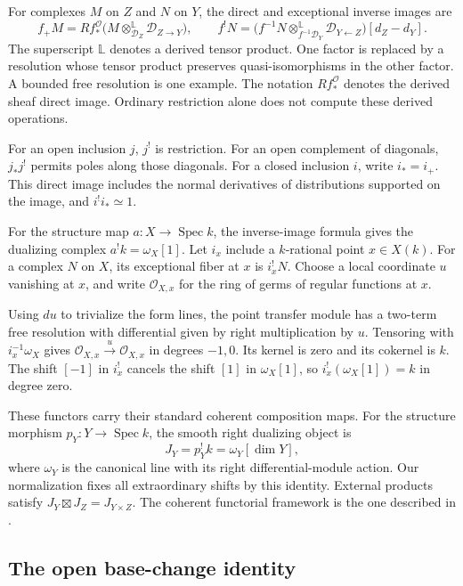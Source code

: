 For complexes $M$ on $Z$ and $N$ on $Y$, the direct and
exceptional inverse images are
\[
 f_+M=Rf_*^{\mathcal O}\bigl(M\otimes^{\mathbb L}_{\mathcal D_Z}
                         \mathcal D_{Z\to Y}\bigr),\qquad
 f^!N=\bigl(f^{-1}N\otimes^{\mathbb L}_{f^{-1}\mathcal D_Y}
                  \mathcal D_{Y\leftarrow Z}\bigr)[d_Z-d_Y].
\]
The superscript $\mathbb L$ denotes a derived tensor product.
One factor is replaced by a resolution whose tensor product preserves
quasi-isomorphisms in the other factor. A bounded free resolution is
one example. The notation $Rf_*^{\mathcal O}$ denotes the derived sheaf direct image.
Ordinary restriction alone does not compute these derived operations.

For an open inclusion $j$, $j^!$ is restriction. For an open complement
of diagonals, $j_*j^!$ permits poles along those diagonals.
For\label{ogd:def:closed-differential-direct-image} a closed inclusion $i$, write $i_*=i_+$. This direct image includes
the normal derivatives of distributions supported on the image,
and $i^!i_*\simeq1$.

For the structure map $a:X\to\operatorname{Spec}k$,
the inverse-image formula gives the dualizing complex
$a^!k=\omega_X[1]$.
Let $i_x$ include a $k$-rational point $x\in X(k)$.
For a complex $N$ on $X$, its exceptional fiber at $x$ is $i_x^!N$.
Choose\label{ogd:def:regular-germ-ring} a local coordinate $u$ vanishing at $x$, and write
$\mathcal O_{X,x}$ for the ring of germs of regular functions at $x$.

Using $du$ to trivialize the form lines, the point transfer module
has a two-term free resolution with differential given by right
multiplication by $u$. Tensoring with $i_x^{-1}\omega_X$ gives
$\mathcal O_{X,x}\xrightarrow{u}\mathcal O_{X,x}$ in degrees $-1,0$.
Its kernel is zero and its cokernel is $k$.
The shift $[-1]$ in $i_x^!$ cancels the shift $[1]$ in $\omega_X[1]$,
so $i_x^!(\omega_X[1])=k$ in degree zero.

These functors carry their standard coherent composition maps.
For the structure morphism \(p_Y:Y\to\operatorname{Spec}k\), the smooth right dualizing object is
\[
 J_Y=p_Y^!k=\omega_Y[\dim Y],
\]
where \(\omega_Y\) is the canonical line with its right differential-module action.
Our normalization fixes all extraordinary shifts by this identity.
External products satisfy \(J_Y\boxtimes J_Z=J_{Y\times Z}\).
The coherent functorial framework is the one described in .

\subsection{The open base-change identity}

